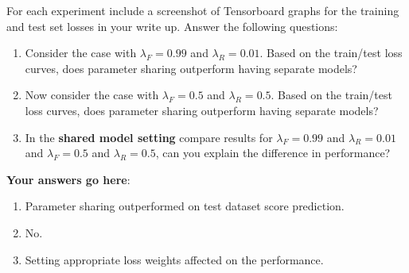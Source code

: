 \documentclass[12pt]{article}
\begin{document}
For each experiment include a screenshot of Tensorboard graphs for the training and test set losses in your write up. Answer the following questions:

\begin{enumerate}
    \item Consider the case with $\lambda_F=0.99$ and $\lambda_R=0.01$. Based on the train/test loss curves, does parameter sharing outperform having separate models? 
    
    \item Now consider the case with $\lambda_F=0.5$ and $\lambda_R=0.5$.  Based on the train/test loss curves, does parameter sharing outperform having separate models? 
    
    \item In the \textbf{shared model setting} compare results for $\lambda_F=0.99$ and $\lambda_R=0.01$ and $\lambda_F=0.5$ and $\lambda_R=0.5$, can you explain the difference in performance?
\end{enumerate}

\noindent\textbf{Your answers go here}:
\begin{enumerate}
\item Parameter sharing outperformed on test dataset score prediction.
\item No.
\item Setting appropriate loss weights affected on the performance.
\end{enumerate}


\newpage


\end{document}
